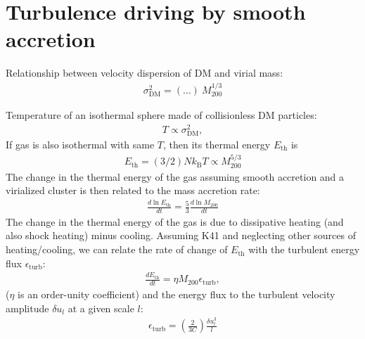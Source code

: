\documentclass[]{article}
\begin{document}
\newpage

\section{Turbulence driving by smooth accretion}

Relationship between velocity dispersion of DM and virial mass:
%
\begin{align}
	\sigma_{\mathrm{DM}}^2 = (\ldots) ~ M_{200}^{1/3}
\end{align}

Temperature of an isothermal sphere made of collisionless DM particles:
%
\begin{align}
	T \propto \sigma_{\mathrm{DM}}^2,
\end{align}
%
If gas is also isothermal with same $T$, then its thermal energy $E_{\mathrm{th}}$ is
%
\begin{align}
	E_{\mathrm{th}} = (3/2) N k_\mathrm{B} T  \propto M_{200}^{5/3}
\end{align}
%
The change in the thermal energy of the gas assuming smooth accretion and a virialized cluster is then related to the mass accretion rate:
%
\begin{align}
	\frac{d \ln E_{\mathrm{th}}}{d t} = \frac{5}{3} \frac{d \ln M_{200}}{d t}
\end{align}
%
The change in the thermal energy of the gas is due to dissipative heating (and also shock heating) minus cooling. Assuming K41 and neglecting other sources of heating/cooling, we can relate the rate of change of $E_{\mathrm{th}}$ with the turbulent energy flux $\epsilon_{\mathrm{turb}}$:
%
\begin{align}
	\frac{d  E_{\mathrm{th}}}{d t} = \eta M_{200} \epsilon_{\mathrm{turb}},
\end{align}
%
($\eta$ is an order-unity coefficient) and the energy flux to the turbulent velocity amplitude $\delta u_l$ at a given scale $l$:
%
\begin{align}
	\epsilon_{\mathrm{turb}} = \left(\frac{2}{3 C}\right) \frac{\delta u_l^3}{l}
\end{align}


\end{document}
